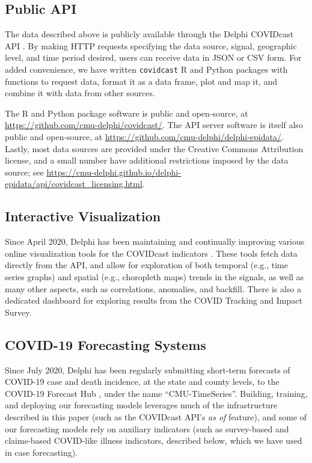 \documentclass[9pt,twocolumn,twoside,lineno]{pnas-new}
\begin{document}
\subsection{Public API}

The data described above is publicly available through the Delphi COVIDcast API
\cite{CovidcastAPI}.  By making HTTP requests specifying the data source,
signal, geographic level, and time period desired, users can receive data in
JSON or CSV form. For added convenience, we have written \texttt{covidcast} R
\cite{CovidcastR} and Python \cite{CovidcastPy} packages with functions to
request data, format it as a data frame, plot and map it, and combine it with
data from other sources.

The R and Python package software is public and open-source, at
\url{https://github.com/cmu-delphi/covidcast/}.  The API server software is
itself also public and open-source, at
\url{https://github.com/cmu-delphi/delphi-epidata/}.  Lastly, most data sources 
are provided under the Creative Commons Attribution license, and a small number
have additional restrictions imposed by the data source; see
\url{https://cmu-delphi.github.io/delphi-epidata/api/covidcast_licensing.html}.

\subsection{Interactive Visualization}

Since April 2020, Delphi has been maintaining and continually improving various
online visualization tools for the COVIDcast indicators \cite{CovidcastViz}.
These tools fetch data directly from the API, and allow for exploration of both 
temporal (e.g., time series graphs) and spatial (e.g., choropleth maps) trends
in the signals, as well as many other aspects, such as correlations, anomalies,
and backfill.  There is also a dedicated dashboard for exploring results from
the COVID Tracking and Impact Survey.   

\subsection{COVID-19 Forecasting Systems} 

Since July 2020, Delphi has been regularly submitting short-term forecasts of
COVID-19 case and death incidence, at the state and county levels, to the
COVID-19 Forecast Hub \cite{ForecastHub}, under the name ``CMU-TimeSeries''.
Building, training, and deploying our forecasting models leverages much of the
infrastructure described in this paper (such as the COVIDcast API's \textit{as
  of} feature), and some of our forecasting models rely on auxiliary indicators
(such as survey-based and claims-based COVID-like illness indicators, described
below, which we have used in case forecasting). 
\end{document}
